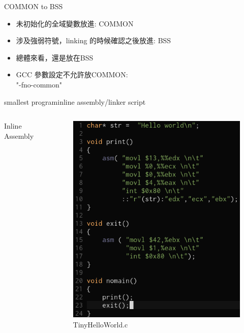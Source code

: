 \begin{frame}{COMMON to BSS}
    \begin{itemize}
        \item 未初始化的全域變數放進: COMMON
        \item 涉及強弱符號，linking 的時候確認之後放進: BSS
        \item 總體來看，還是放在BSS
        \item GCC 參數設定不允許放COMMON:\\
            "-fno-common"
    \end{itemize}
\end{frame}

\begin{frame}{smallest program}{inline assembly/linker script}
    \begin{columns}[t]
        Inline Assembly
        \begin{figure}
            \begin{center}
                \includegraphics[width=\textwidth]{./img/inlineasm.png}
                \caption{TinyHelloWorld.c}
            \end{center}

\end{figure}
\end{columns}
\end{frame}
